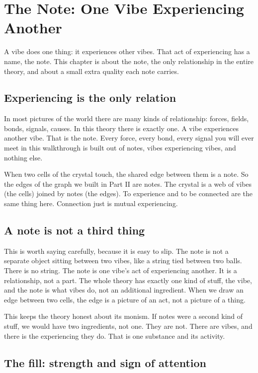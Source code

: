 \section{The Note: One Vibe Experiencing Another}

A vibe does one thing: it experiences other vibes. That act of experiencing has a name, the note. This chapter is about the note, the only relationship in the entire theory, and about a small extra quality each note carries.

\subsection{Experiencing is the only relation}

In most pictures of the world there are many kinds of relationship: forces, fields, bonds, signals, causes. In this theory there is exactly one. A vibe experiences another vibe. That is the note. Every force, every bond, every signal you will ever meet in this walkthrough is built out of notes, vibes experiencing vibes, and nothing else.

When two cells of the crystal touch, the shared edge between them is a note. So the edges of the graph we built in Part II are notes. The crystal is a web of vibes (the cells) joined by notes (the edges). To experience and to be connected are the same thing here. Connection just is mutual experiencing.

\subsection{A note is not a third thing}

This is worth saying carefully, because it is easy to slip. The note is not a separate object sitting between two vibes, like a string tied between two balls. There is no string. The note is one vibe's act of experiencing another. It is a relationship, not a part. The whole theory has exactly one kind of stuff, the vibe, and the note is what vibes do, not an additional ingredient. When we draw an edge between two cells, the edge is a picture of an act, not a picture of a thing.

This keeps the theory honest about its monism. If notes were a second kind of stuff, we would have two ingredients, not one. They are not. There are vibes, and there is the experiencing they do. That is one substance and its activity.

\subsection{The fill: strength and sign of attention}

